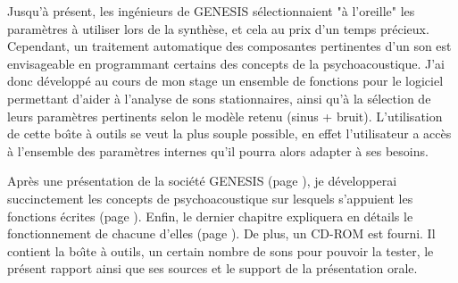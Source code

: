 Jusqu'{\`a} pr{\'e}sent, les ing{\'e}nieurs de GENESIS s{\'e}lectionnaient "{\`a}
l'oreille" les param{\`e}tres {\`a} utiliser lors de la synth{\`e}se, et cela
au prix d'un temps pr{\'e}cieux. Cependant, un traitement automatique
des composantes pertinentes d'un son est envisageable en
programmant certains des concepts de la psychoacoustique. J'ai
donc d{\'e}velopp{\'e} au cours de mon stage un ensemble de fonctions pour
le logiciel \matlabv permettant d'aider {\`a} l'analyse de sons
stationnaires, ainsi qu'{\`a} la s{\'e}lection de leurs param{\`e}tres
pertinents selon le mod{\`e}le retenu (sinus + bruit). L'utilisation
de cette bo{\^\i}te {\`a} outils se veut la plus souple possible, en effet
l'utilisateur a acc{\`e}s {\`a} l'ensemble des param{\`e}tres internes qu'il
pourra alors adapter {\`a} ses besoins.

Apr{\`e}s une pr{\'e}sentation de la soci{\'e}t{\'e} GENESIS (page
\pageref{genesis}), je d{\'e}velopperai succinctement les concepts de
psychoacoustique sur lesquels s'appuient les fonctions {\'e}crites
(page \pageref{theorie}). Enfin, le dernier chapitre expliquera en
d{\'e}tails le fonctionnement de chacune d'elles (page
\pageref{manuel}). De plus, un CD-ROM est fourni. Il contient la
bo{\^\i}te {\`a} outils, un certain nombre de sons pour pouvoir la tester,
le pr{\'e}sent rapport ainsi que ses sources et le support de la
pr{\'e}sentation orale.
